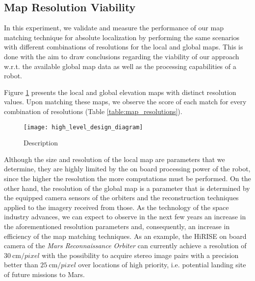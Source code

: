 \subsection{Map Resolution Viability}

In this experiment, we validate and measure the performance of our map
matching technique for absolute localization by performing the same
scenarios with different combinations of resolutions for the local and
global maps.
This is done with the aim to draw conclusions regarding the viability
of our approach w.r.t. the available global map data as well as
the processing capabilities of a robot.

Figure \ref{fig:map_resolutions} presents the local and global elevation
maps with distinct resolution values.
Upon matching these maps, we observe the score of each match for every
combination of resolutions (Table \ref{table:map_resolutions}).

\begin{figure}
    \centering
    \texttt{[image: high\_level\_design\_diagram]}
    \caption[Name]{
        Description
    }
    \label{fig:map_resolutions}
\end{figure}

Although the size and resolution of the local map are parameters that we
determine, they are highly limited by the on board processing power of the
robot, since the higher the resolution the more computations must be performed.
On the other hand, the resolution of the global map is a parameter that is
determined by the equipped camera sensors of the orbiters and the
reconstruction techniques applied to the imagery received from those.
As the technology of the space industry advances, we can expect to observe
in the next few years an increase in the aforementioned resolution parameters
and, consequently, an increase in efficiency of the map matching techniques.
As an example, the HiRISE on board camera of the
\textit{Mars Reconnaissance Orbiter} can currently achieve a resolution of
$\SI{30}{\cm \per pixel}$ with the possibility to acquire stereo image pairs
with a precision better than $\SI{25}{\cm \per pixel}$ over locations of
high priority, i.e. potential landing site of future missions to Mars.

